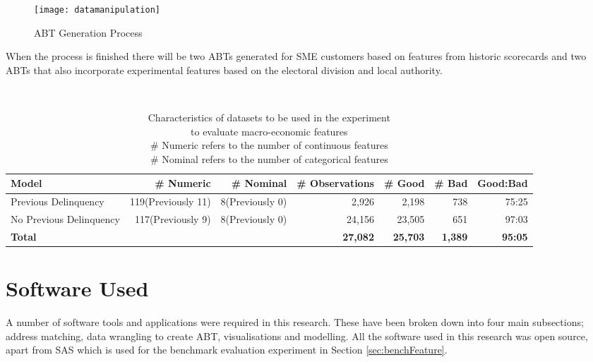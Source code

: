 \begin{figure}[H]
	\texttt{[image: datamanipulation]}
	\caption{ABT Generation Process}
	\label{fig:datamanipulation}
\end{figure}

When the process is finished there will be two ABTs generated for SME customers based on features from historic scorecards and two ABTs that also incorporate experimental features based on the electoral division and local authority.

\begin{table}[H]
	\centering\
	\resizebox{\textwidth}{!}
	{
		\begin{tabular}{l r r r r r r}
			\hline
			\textbf{Model} &  \textbf{\# Numeric} & \textbf{\# Nominal} & \textbf{\# Observations} & \textbf{\# Good} & \textbf{\# Bad} & \textbf{Good:Bad}\\
			\hline
			Previous Delinquency & 119(Previously 11) & 8(Previously 0) & 2,926 & 2,198  & 738 & 75:25 \\ 
			No Previous Delinquency & 117(Previously 9)  & 8(Previously 0) & 24,156 & 23,505 & 651  & 97:03 \\ \hline
			\textbf{Total} &  &  & \textbf{27,082} & \textbf{25,703} & \textbf{1,389} & \textbf{95:05} \\ \hline
		\end{tabular}
	}
	\caption{Characteristics of datasets to be used in the experiment \\to evaluate macro-economic features \\
		\# Numeric refers to the number of continuous features \\
		\# Nominal refers to the number of categorical features
	}
	\label{characteristicsMacroDatasets}
\end{table}

\section{Software Used}\label{chp3:softwareUsed}
A number of software tools and applications were required in this research. These have been broken down into four main subsections; address matching, data wrangling to create ABT, visualisations and modelling. All the software used in this research was open source, apart from SAS which is used for the benchmark evaluation experiment in Section \ref{sec:benchFeature}. 
 
